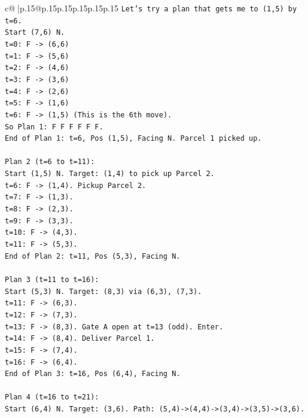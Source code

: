 \documentclass{article}
\begin{document}
{\begin{supertabular}{c@{$\;$}|p{.15\linewidth}@{}p{.15\linewidth}p{.15\linewidth}p{.15\linewidth}p{.15\linewidth}p{.15\linewidth}}
{{{\texttt{Let's try a plan that gets me to (1,5) by t=6.} \\
\texttt{Start (7,6) N.} \\
\texttt{t=0: F {-}> (6,6)} \\
\texttt{t=1: F {-}> (5,6)} \\
\texttt{t=2: F {-}> (4,6)} \\
\texttt{t=3: F {-}> (3,6)} \\
\texttt{t=4: F {-}> (2,6)} \\
\texttt{t=5: F {-}> (1,6)} \\
\texttt{t=6: F {-}> (1,5) (This is the 6th move).} \\
\texttt{So Plan 1: F F F F F F.} \\
\texttt{End of Plan 1: t=6, Pos (1,5), Facing N. Parcel 1 picked up.} \\
\\ 
\texttt{Plan 2 (t=6 to t=11):} \\
\texttt{Start (1,5) N. Target: (1,4) to pick up Parcel 2.} \\
\texttt{t=6: F {-}> (1,4). Pickup Parcel 2.} \\
\texttt{t=7: F {-}> (1,3).} \\
\texttt{t=8: F {-}> (2,3).} \\
\texttt{t=9: F {-}> (3,3).} \\
\texttt{t=10: F {-}> (4,3).} \\
\texttt{t=11: F {-}> (5,3).} \\
\texttt{End of Plan 2: t=11, Pos (5,3), Facing N.} \\
\\ 
\texttt{Plan 3 (t=11 to t=16):} \\
\texttt{Start (5,3) N. Target: (8,3) via (6,3), (7,3).} \\
\texttt{t=11: F {-}> (6,3).} \\
\texttt{t=12: F {-}> (7,3).} \\
\texttt{t=13: F {-}> (8,3). Gate A open at t=13 (odd). Enter.} \\
\texttt{t=14: F {-}> (8,4). Deliver Parcel 1.} \\
\texttt{t=15: F {-}> (7,4).} \\
\texttt{t=16: F {-}> (6,4).} \\
\texttt{End of Plan 3: t=16, Pos (6,4), Facing N.} \\
\\ 
\texttt{Plan 4 (t=16 to t=21):} \\
\texttt{Start (6,4) N. Target: (3,6). Path: (5,4){-}>(4,4){-}>(3,4){-}>(3,5){-}>(3,6).} \\
}}}
\end{supertabular}}
\end{document}
